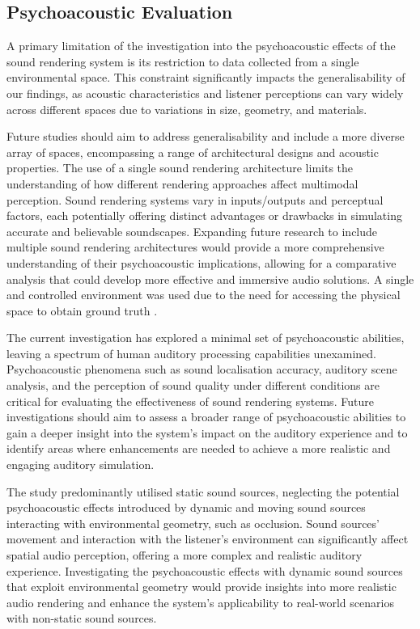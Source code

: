 \subsection{Psychoacoustic Evaluation}
A primary limitation of the investigation into the psychoacoustic effects of the sound rendering system is its restriction to data collected from a single environmental space. This constraint significantly impacts the generalisability of our findings, as acoustic characteristics and listener perceptions can vary widely across different spaces due to variations in size, geometry, and materials.\par
Future studies should aim to address generalisability and include a more diverse array of spaces, encompassing a range of architectural designs and acoustic properties. The use of a single sound rendering architecture limits the understanding of how different rendering approaches affect multimodal perception. Sound rendering systems vary in inputs/outputs and perceptual factors, each potentially offering distinct advantages or drawbacks in simulating accurate and believable soundscapes. Expanding future research to include multiple sound rendering architectures would provide a more comprehensive understanding of their psychoacoustic implications, allowing for a comparative analysis that could develop more effective and immersive audio solutions. A single and controlled environment was used due to the need for accessing the physical space to obtain ground truth .\par
The current investigation has explored a minimal set of psychoacoustic abilities, leaving a spectrum of human auditory processing capabilities unexamined. Psychoacoustic phenomena such as sound localisation accuracy, auditory scene analysis, and the perception of sound quality under different conditions are critical for evaluating the effectiveness of sound rendering systems. Future investigations should aim to assess a broader range of psychoacoustic abilities to gain a deeper insight into the system's impact on the auditory experience and to identify areas where enhancements are needed to achieve a more realistic and engaging auditory simulation.\par
The study predominantly utilised static sound sources, neglecting the potential psychoacoustic effects introduced by dynamic and moving sound sources interacting with environmental geometry, such as occlusion. Sound sources' movement and interaction with the listener's environment can significantly affect spatial audio perception, offering a more complex and realistic auditory experience. Investigating the psychoacoustic effects with dynamic sound sources that exploit environmental geometry would provide insights into more realistic audio rendering and enhance the system's applicability to real-world scenarios with non-static sound sources.\par

